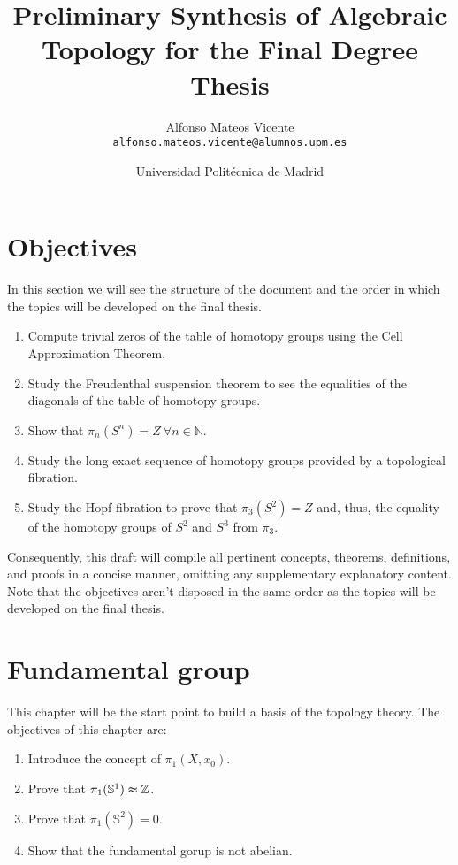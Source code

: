 \documentclass[12pt]{article}
\title{Preliminary Synthesis of Algebraic Topology for the Final Degree Thesis} %
\author{Alfonso Mateos Vicente\\ \texttt{alfonso.mateos.vicente@alumnos.upm.es}} %
\date{Universidad Politécnica de Madrid} %
\begin{document}
\maketitle

\newpage
\tableofcontents
\newpage

\section*{Objectives}

In this section we will see the structure of the document and the order in which the topics will be developed on the final thesis.

\begin{enumerate}
	\item Compute trivial zeros of the table of homotopy groups using the Cell Approximation Theorem. 
	\item Study the Freudenthal suspension theorem to see the equalities of the diagonals of the table of homotopy groups.
	\item Show that \(\pi_n(S^n) = Z \ \forall n \in \mathbb{N}\).
	\item Study the long exact sequence of homotopy groups provided by a topological fibration.
	\item Study the Hopf fibration to prove that \(\pi_3(S^2) =Z\) and, thus, the equality of the homotopy groups of \(S^2\) and \(S^3\) from \(\pi_3\).
\end{enumerate}

Consequently, this draft will compile all pertinent concepts, theorems, definitions, and proofs in a concise manner, omitting any supplementary explanatory content. Note that the objectives aren't disposed in the same order as the topics will be developed on the final thesis.

\section{Fundamental group}

This chapter will be the start point to build a basis of the topology theory. The objectives of this chapter are:

\begin{enumerate}
	\item Introduce the concept of \(\pi_1(X, x_0)\).
	\item Prove that \(\pi_1(\mathbb{S}^1) \thickapprox \mathbb{Z}\).
	\item Prove that \(\pi_1(\mathbb{S}^2) = 0\).
	\item Show that the fundamental gorup is not abelian.
\end{enumerate}
\end{document}

